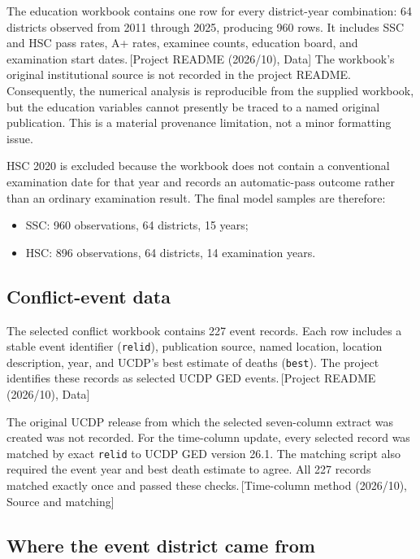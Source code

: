 \documentclass[11pt]{article}
\newcommand{\sourceref}[1]{\textcolor{black!65}{\,[#1]}}
\begin{document}
The education workbook contains one row for every district-year combination: 64 districts observed from 2011 through 2025, producing 960 rows. It includes SSC and HSC pass rates, A+ rates, examinee counts, education board, and examination start dates.\sourceref{Project README (2026/10), Data} The workbook's original institutional source is not recorded in the project README. Consequently, the numerical analysis is reproducible from the supplied workbook, but the education variables cannot presently be traced to a named original publication. This is a material provenance limitation, not a minor formatting issue.

HSC 2020 is excluded because the workbook does not contain a conventional examination date for that year and records an automatic-pass outcome rather than an ordinary examination result. The final model samples are therefore:

\begin{itemize}
  \item SSC: 960 observations, 64 districts, 15 years;
  \item HSC: 896 observations, 64 districts, 14 examination years.
\end{itemize}

\subsection{Conflict-event data}

The selected conflict workbook contains 227 event records. Each row includes a stable event identifier (\texttt{relid}), publication source, named location, location description, year, and UCDP's best estimate of deaths (\texttt{best}). The project identifies these records as selected UCDP GED events.\sourceref{Project README (2026/10), Data}

The original UCDP release from which the selected seven-column extract was created was not recorded. For the time-column update, every selected record was matched by exact \texttt{relid} to UCDP GED version 26.1. The matching script also required the event year and best death estimate to agree. All 227 records matched exactly once and passed these checks.\sourceref{Time-column method (2026/10), Source and matching}

\subsection{Where the event district came from}
\label{sec:district-provenance}
\end{document}
